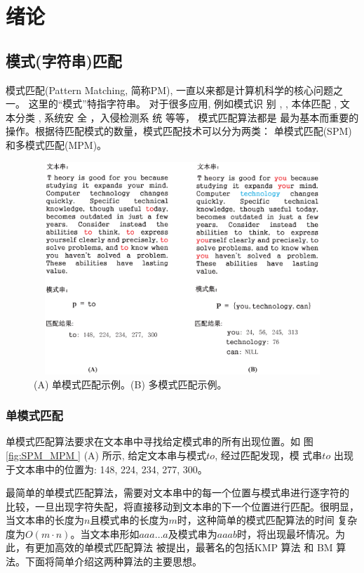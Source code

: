 \chapter{绪论}

\section{模式(字符串)匹配}

模式匹配(Pattern Matching, 简称PM), 一直以来都是计算机科学的核心问题之
一。 这里的“模式”特指字符串。 对于很多应用, 例如模式识
别 \cite{Yan2016}, \cite{Xiao2016}, 本体匹配 \cite{Xue2015}
\cite{Xue2016}, 文本分类 \cite{Tang2015} \cite{Zhang2016}, 系统安
全 \cite{Dien2014,Malhotra2016,Fan2016}，入侵检测系
统 \cite{Kim2015,Arney2016,Sadotra2016,Lee2017} 等等， 模式匹配算法都是
最为基本而重要的操作。根据待匹配模式的数量，模式匹配技术可以分为两类：
单模式匹配(SPM)和多模式匹配(MPM)。

\begin{figure}[!h]
  \centering
  \includegraphics[height=8cm ,width=12cm]{figures/1_Introduction/SPM_MPM.eps}
  \caption{(A) 单模式匹配示例。(B) 多模式匹配示例。}
  \label{fig:SPM_MPM}
\end{figure}


\subsection{单模式匹配}

单模式匹配算法要求在文本串中寻找给定模式串的所有出现位置。如
图 \ref{fig:SPM_MPM } (A) 所示, 给定文本串与模式$to$, 经过匹配发现，模
式串$to$ 出现于文本串中的位置为: 148, 224, 234, 277, 300。

最简单的单模式匹配算法，需要对文本串中的每一个位置与模式串进行逐字符的
比较，一旦出现字符失配，将直接移动到文本串的下一个位置进行匹配。很明显，
当文本串的长度为$n$且模式串的长度为$m$时，这种简单的模式匹配算法的时间
复杂度为$O(m \cdot
n)$。当文本串形如$aaa \dots
a$及模式串为$aaab$时，将出现最坏情况。为此，有更加高效的单模式匹配算法
被提出，最著名的包括KMP \cite{Knuth1977}算法 和 BM \cite{Boyer1977} 算
法。下面将简单介绍这两种算法的主要思想。


